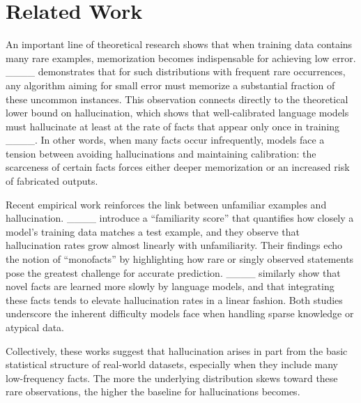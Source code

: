 \section{Related Work}
An important line of theoretical research shows that when training data contains many rare examples, memorization becomes indispensable for achieving low error. ____ demonstrates that for such distributions with frequent rare occurrences, any algorithm aiming for small error must memorize a substantial fraction of these uncommon instances. This observation connects directly to the theoretical lower bound on hallucination, which shows that well-calibrated language models must hallucinate at least at the rate of facts that appear only once in training ____. In other words, when many facts occur infrequently, models face a tension between avoiding hallucinations and maintaining calibration: the scarceness of certain facts forces either deeper memorization or an increased risk of fabricated outputs.

Recent empirical work reinforces the link between unfamiliar examples and hallucination. ____ introduce a “familiarity score” that quantifies how closely a model’s training data matches a test example, and they observe that hallucination rates grow almost linearly with unfamiliarity. Their findings echo the notion of “monofacts” by highlighting how rare or singly observed statements pose the greatest challenge for accurate prediction. ____ similarly show that novel facts are learned more slowly by language models, and that integrating these facts tends to elevate hallucination rates in a linear fashion. Both studies underscore the inherent difficulty models face when handling sparse knowledge or atypical data.

Collectively, these works suggest that hallucination arises in part from the basic statistical structure of real-world datasets, especially when they include many low-frequency facts. The more the underlying distribution skews toward these rare observations, the higher the baseline for hallucinations becomes.